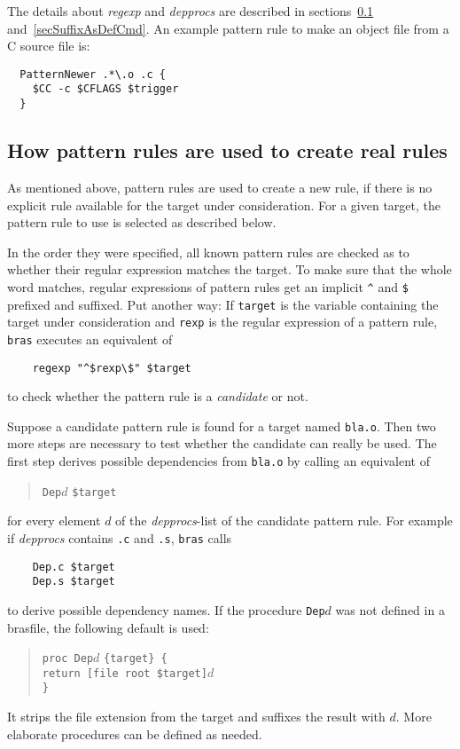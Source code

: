\documentclass[12pt]{article}
\newcommand{\bras}{\texttt{bras}}
\begin{document}
The details about \textit{regexp} and \textit{depprocs} are described
in sections~\ref{secSuffixToReal} and~\ref{secSuffixAsDefCmd}.
An example pattern rule to make an object file from a C source file is:
\begin{verbatim}
  PatternNewer .*\.o .c {
    $CC -c $CFLAGS $trigger
  }
\end{verbatim}

\subsection{How pattern rules are used to create real rules}
\label{secSuffixToReal}

As mentioned above, pattern rules are used to create a new rule, if
there is no explicit rule available for the target under
consideration. 
For a given target, the pattern rule to use is selected as described
below.

In the order they were specified, all known pattern rules are checked
as to whether their regular expression matches the target. To make
sure that the whole word matches, regular expressions of pattern rules
get an implicit \verb+^+ and \texttt{\$} prefixed and suffixed. Put
another way: If \texttt{target} is the variable containing the target
under consideration and \texttt{rexp} is the regular expression of a
pattern rule, \bras{} executes an equivalent of
\begin{verbatim}
    regexp "^$rexp\$" $target
\end{verbatim}
to check whether the pattern rule is a \textit{candidate} or not.

Suppose a candidate pattern rule is found for a target named
\texttt{bla.o}. Then two more steps are necessary
to test whether the candidate can really be used.
The first step derives possible dependencies
from \texttt{bla.o} by calling
an equivalent of
\begin{quote}
    \texttt{Dep}$d$ \texttt{\$target}
\end{quote}
for every element $d$ of the \textit{depprocs}-list of the candidate
pattern rule. For example if \textit{depprocs} contains \texttt{.c}
and \texttt{.s}, \bras{} calls
\begin{verbatim}
    Dep.c $target
    Dep.s $target
\end{verbatim}
to derive possible dependency names. If the procedure \texttt{Dep$d$}
was not defined in a brasfile, the following
default is used:
\begin{quote}
    \verb|proc Dep|$d$ \verb|{target} {|\\
    \texttt{\hspace*{2em}return [file root \$target]$d$}\\
    \verb|}|
\end{quote}
It strips the file extension from the target and suffixes the
result with $d$. More elaborate procedures can be defined as needed.
\end{document}
